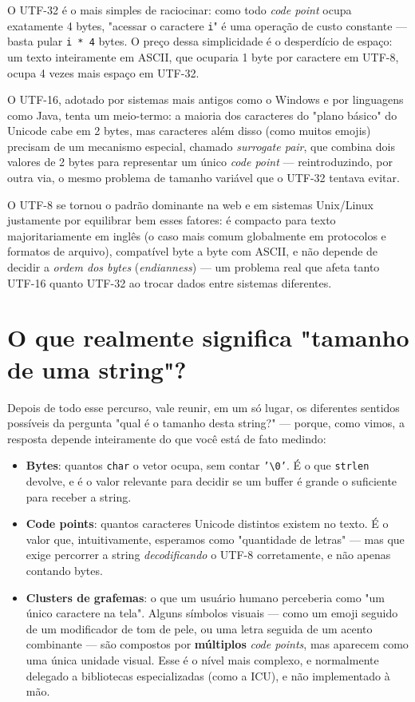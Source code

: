 \documentclass[12pt,a4paper,oneside]{extreport}
\begin{document}
O UTF-32 é o mais simples de raciocinar: como todo \textit{code point} ocupa exatamente 4 bytes, "acessar o caractere \texttt{i}" é uma operação de custo constante — basta pular \texttt{i * 4} bytes. O preço dessa simplicidade é o desperdício de espaço: um texto inteiramente em ASCII, que ocuparia 1 byte por caractere em UTF-8, ocupa 4 vezes mais espaço em UTF-32.

O UTF-16, adotado por sistemas mais antigos como o Windows e por linguagens como Java, tenta um meio-termo: a maioria dos caracteres do "plano básico" do Unicode cabe em 2 bytes, mas caracteres além disso (como muitos emojis) precisam de um mecanismo especial, chamado \textit{surrogate pair}, que combina dois valores de 2 bytes para representar um único \textit{code point} — reintroduzindo, por outra via, o mesmo problema de tamanho variável que o UTF-32 tentava evitar.

O UTF-8 se tornou o padrão dominante na web e em sistemas Unix/Linux justamente por equilibrar bem esses fatores: é compacto para texto majoritariamente em inglês (o caso mais comum globalmente em protocolos e formatos de arquivo), compatível byte a byte com ASCII, e não depende de decidir a \textit{ordem dos bytes} (\textit{endianness}) — um problema real que afeta tanto UTF-16 quanto UTF-32 ao trocar dados entre sistemas diferentes.

\section*{O que realmente significa "tamanho de uma string"?}

Depois de todo esse percurso, vale reunir, em um só lugar, os diferentes sentidos possíveis da pergunta "qual é o tamanho desta string?" — porque, como vimos, a resposta depende inteiramente do que você está de fato medindo:

\begin{itemize}
    \item \textbf{Bytes}: quantos \texttt{char} o vetor ocupa, sem contar \texttt{'\textbackslash 0'}. É o que \texttt{strlen} devolve, e é o valor relevante para decidir se um buffer é grande o suficiente para receber a string.
    \item \textbf{Code points}: quantos caracteres Unicode distintos existem no texto. É o valor que, intuitivamente, esperamos como "quantidade de letras" — mas que exige percorrer a string \textit{decodificando} o UTF-8 corretamente, e não apenas contando bytes.
    \item \textbf{Clusters de grafemas}: o que um usuário humano perceberia como "um único caractere na tela". Alguns símbolos visuais — como um emoji seguido de um modificador de tom de pele, ou uma letra seguida de um acento combinante — são compostos por \textbf{múltiplos} \textit{code points}, mas aparecem como uma única unidade visual. Esse é o nível mais complexo, e normalmente delegado a bibliotecas especializadas (como a ICU), e não implementado à mão.
\end{itemize}
\end{document}
